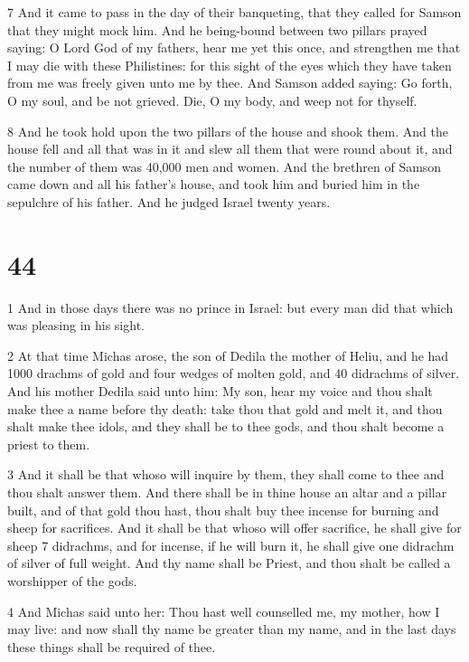 \par 7 And it came to pass in the day of their banqueting, that they called for Samson that they might mock him. And he being-bound between two pillars prayed saying: O Lord God of my fathers, hear me yet this once, and strengthen me that I may die with these Philistines: for this sight of the eyes which they have taken from me was freely given unto me by thee. And Samson added saying: Go forth, O my soul, and be not grieved. Die, O my body, and weep not for thyself. 

\par 8 And he took hold upon the two pillars of the house and shook them. And the house fell and all that was in it and slew all them that were round about it, and the number of them was 40,000 men and women. And the brethren of Samson came down and all his father's house, and took him and buried him in the sepulchre of his father. And he judged Israel twenty years.

\chapter{44}

\par 1 And in those days there was no prince in Israel: but every man did that which was pleasing in his sight.

\par 2 At that time Michas arose, the son of Dedila the mother of Heliu, and he had 1000 drachms of gold and four wedges of molten gold, and 40 didrachms of silver. And his mother Dedila said unto him: My son, hear my voice and thou shalt make thee a name before thy death: take thou that gold and melt it, and thou shalt make thee idols, and they shall be to thee gods, and thou shalt become a priest to them. 

\par 3 And it shall be that whoso will inquire by them, they shall come to thee and thou shalt answer them. And there shall be in thine house an altar and a pillar built, and of that gold thou hast, thou shalt buy thee incense for burning and sheep for sacrifices. And it shall be that whoso will offer sacrifice, he shall give for sheep 7 didrachms, and for incense, if he will burn it, he shall give one didrachm of silver of full weight. And thy name shall be Priest, and thou shalt be called a worshipper of the gods. 

\par 4 And Michas said unto her: Thou hast well counselled me, my mother, how I may live: and now shall thy name be greater than my name, and in the last days these things shall be required of thee. 

